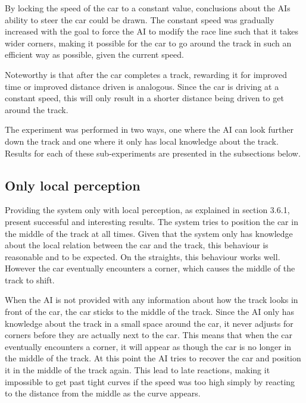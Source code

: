 By locking the speed of the car to a constant value, conclusions about the AIs ability to steer the car could be drawn. The constant speed was gradually increased with the goal to force the AI to modify the race line such that it takes wider corners, making it possible for the car to go around the track in such an efficient way as possible, given the current speed.

Noteworthy is that after the car completes a track, rewarding it for improved time or improved distance driven is analogous. Since the car is driving at a constant speed, this will only result in a shorter distance being driven to get around the track.

The experiment was performed in two ways, one where the AI can look further down the track and one where it only has local knowledge about the track. Results for each of these sub-experiments are presented in the subsections below.



\subsection{Only local perception}
Providing the system only with local perception, as explained in section 3.6.1, present successful and interesting results. The system tries to position the car in the middle of the track at all times. Given that the system only has knowledge about the local relation between the car and the track, this behaviour is reasonable and to be expected. On the straights, this behaviour works well. However the car eventually encounters a corner, which causes the middle of the track to shift.

When the AI is not provided with any information about how the track looks in front of the car, the car sticks to the middle of the track. Since the AI only has knowledge about the track in a small space around the car, it never adjusts for corners before they are actually next to the car. This means that when the car eventually encounters a corner, it will appear as though the car is no longer in the middle of the track. At this point the AI tries to recover the car and position it in the middle of the track again. This lead to late reactions, making it impossible to get past tight curves if the speed was too high simply by reacting to the distance from the middle as the curve appears.

